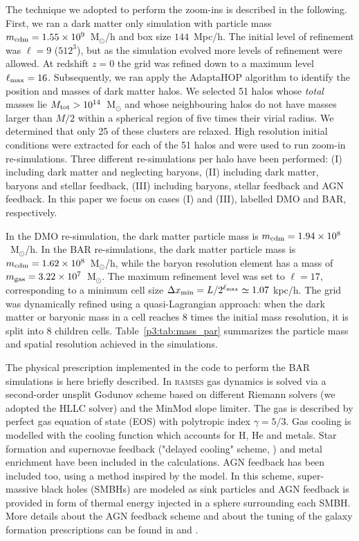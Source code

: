\documentclass[
  11pt,
  twoside,
  openright,
  titlepage,
  headings=optiontoheadandtoc
]{scrbook}
\begin{document}
The technique we adopted to perform the zoom-ins is described in the following. First, we ran a dark matter only simulation with particle mass $m_{\rm cdm}=1.55\times 10^9$~M$_\odot$/h 
and box size $144$~Mpc/h. The initial level of refinement was $\ell=9$ ($512^3$), but as the simulation evolved more levels of refinement were allowed. At redshift $z=0$ the grid was 
refined down to a maximum level $\ell_{\rm max}=16$. Subsequently, we ran apply the AdaptaHOP algorithm \cite{2004MNRAS.352..376A} to identify the position and masses of dark 
matter halos. We selected 51 halos whose {\it total} masses lie $M_{\rm tot}>10^{14}$~M$_\odot$ and whose neighbouring halos do not have masses larger than $M/2$ within a spherical 
region of five times their virial radius. We determined that only 25 of these clusters are relaxed. High resolution initial conditions were extracted for each of the 51 halos and were used 
to run zoom-in re-simulations. Three different re-simulations per halo have been performed: (I) including dark matter and neglecting baryons, (II) including dark matter, baryons 
and stellar feedback, (III) including baryons, stellar feedback and AGN feedback. In this paper we focus on cases (I) and (III), labelled DMO and BAR, respectively.

In the DMO re-simulation, the dark matter particle mass is $m_{\rm cdm}=1.94\times 10^{8}$~M$_\odot$/h. In the BAR re-simulations, the dark matter particle mass is 
$m_{\rm cdm}=1.62\times 10^{8}$~M$_\odot$/h, while the baryon resolution element has a mass of $m_{\rm gas}=3.22\times 10^{7}$~M$_\odot$. The maximum refinement level was set to $\ell=17$, 
corresponding to a minimum cell size $\Delta x_{\rm min} = L/2^{\ell_{\rm max}}\simeq 1.07$ kpc/h. The grid was dynamically refined using a quasi-Lagrangian approach: 
when the dark matter or baryonic mass in a cell reaches 8 times the initial mass resolution, it is split into 8 children cells. Table~\ref{p3:tab:mass_par} summarizes the particle mass and 
spatial resolution achieved in the simulations.

The physical prescription implemented in the code to perform the BAR simulations is here briefly described. In {\scshape ramses} gas dynamics is solved via a second-order unsplit Godunov 
scheme \citep{2002A&A...385..337T} based on different Riemann solvers (we adopted the HLLC solver) and the MinMod slope limiter. The gas is described by perfect gas equation of state 
(EOS) with polytropic index $\gamma=5/3$. Gas cooling is modelled with the \cite{1993ApJS...88..253S} cooling function which accounts for H, He and metals. Star formation and supernovae 
feedback ("delayed cooling" scheme, \cite{2006MNRAS.373.1074S}) and metal enrichment have been included in the calculations. AGN feedback has been included too, using a method inspired by 
the \cite{2009MNRAS.398...53B} model. In this scheme, super-massive black holes (SMBHs) are modeled as sink particles and AGN feedback is provided in form of thermal energy injected in a 
sphere surrounding each SMBH. More details about the AGN feedback scheme and about the tuning of the galaxy formation prescriptions can be found in \cite{2011MNRAS.414..195T} and \cite{2012MNRAS.422.3081M}.
\end{document}

